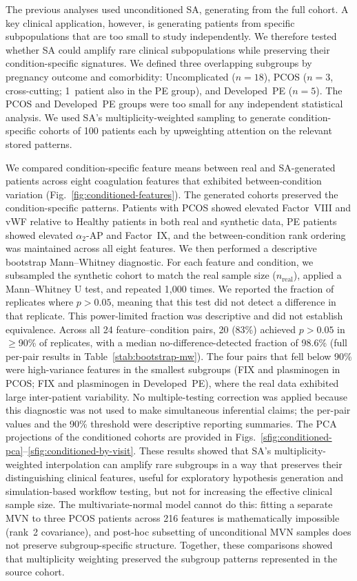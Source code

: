 The previous analyses used unconditioned SA, generating from the full cohort. A key
clinical application, however, is generating patients from specific subpopulations
that are too small to study independently. We therefore tested whether SA could
amplify rare clinical subpopulations while preserving their
condition-specific signatures. We defined three overlapping subgroups by pregnancy
outcome and comorbidity: Uncomplicated ($n{=}18$), PCOS ($n{=}3$, cross-cutting;
1~patient also in the PE group), and Developed~PE ($n{=}5$). The PCOS and
Developed~PE groups were too small for any independent statistical analysis. We used
SA's multiplicity-weighted sampling to generate condition-specific cohorts of 100
patients each by upweighting attention on the relevant stored patterns.

We compared condition-specific feature means between real and SA-generated patients
across eight coagulation features that exhibited between-condition variation
(Fig.~\ref{fig:conditioned-features}). The generated cohorts preserved the
condition-specific patterns. Patients with PCOS showed elevated Factor~VIII and vWF
relative to Healthy patients in both real and synthetic data, PE patients showed
elevated $\alpha_2$-AP and Factor~IX, and the between-condition rank ordering was
maintained across all eight features. We then performed a descriptive bootstrap
Mann--Whitney diagnostic. For each feature and condition, we subsampled the
synthetic cohort to match the real sample size ($n_{\text{real}}$), applied a
Mann--Whitney U test, and repeated 1,000 times. We reported the fraction of
replicates where $p > 0.05$, meaning that this test did not detect a difference in
that replicate. This power-limited fraction was descriptive and did not establish
equivalence. Across all 24 feature--condition pairs, 20 (83\%) achieved
$p > 0.05$ in $\geq$90\% of replicates, with a median
no-difference-detected fraction of 98.6\% (full per-pair results in
Table~\ref{stab:bootstrap-mw}). The four pairs that fell below 90\% were
high-variance features in the smallest subgroups (FIX and plasminogen in PCOS;
FIX and plasminogen in Developed~PE), where the real data exhibited large
inter-patient variability. No multiple-testing correction was applied because this
diagnostic was not used to make simultaneous inferential claims; the per-pair values and the
90\% threshold were descriptive reporting summaries. The PCA projections of the conditioned cohorts are provided in
Figs.~\ref{sfig:conditioned-pca}--\ref{sfig:conditioned-by-visit}. These results showed that SA's multiplicity-weighted
interpolation can amplify rare subgroups in a way that preserves their distinguishing
clinical features, useful for exploratory hypothesis generation and simulation-based
workflow testing, but not for increasing the effective clinical sample size. The multivariate-normal model cannot do this:
fitting a separate MVN to three PCOS patients across 216 features is mathematically
impossible (rank~2 covariance), and post-hoc subsetting of unconditional MVN samples
does not preserve subgroup-specific structure. Together, these comparisons showed that
multiplicity weighting preserved the subgroup patterns represented in the source cohort.

